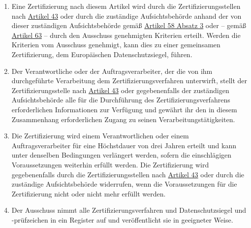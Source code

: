 \begin{enumerate}
  \item Eine Zertifizierung nach diesem Artikel wird durch die Zertifizierungsstellen nach \hyperref[ch:43]{Artikel 43}
   oder durch die zuständige Aufsichtsbehörde anhand der von dieser zuständigen Aufsichtsbehörde gemäß \hyperref
   [itm:58-3]{Artikel 58 Absatz 3} oder -- gemäß \hyperref[ch:63]{Artikel 63} -- durch den Ausschuss genehmigten
   Kriterien erteilt. Werden die Kriterien vom Ausschuss genehmigt, kann dies zu einer gemeinsamen Zertifizierung, dem
   Europäischen Datenschutzsiegel, führen.
  \label{itm:42-5}

  \item Der Verantwortliche oder der Auftragsverarbeiter, der die von ihm durchgeführte Verarbeitung dem
   Zertifizierungsverfahren unterwirft, stellt der Zertifizierungsstelle nach \hyperref[ch:43]{Artikel 43} oder
   gegebenenfalls der zuständigen Aufsichtsbehörde alle für die Durchführung des Zertifizierungsverfahrens
   erforderlichen Informationen zur Verfügung und gewährt ihr den in diesem Zusammenhang erforderlichen Zugang zu
   seinen Verarbeitungstätigkeiten.
  \label{itm:42-6}

  \item Die Zertifizierung wird einem Verantwortlichen oder einem Auftragsverarbeiter für eine Höchstdauer von drei
   Jahren erteilt und kann unter denselben Bedingungen verlängert werden, sofern die einschlägigen Voraussetzungen
   weiterhin erfüllt werden. Die Zertifizierung wird gegebenenfalls durch die Zertifizierungsstellen nach \hyperref
   [ch:43]{Artikel 43} oder durch die zuständige Aufsichtsbehörde widerrufen, wenn die Voraussetzungen für die
   Zertifizierung nicht oder nicht mehr erfüllt werden.
  \label{itm:42-7}

  \item Der Ausschuss nimmt alle Zertifizierungsverfahren und Datenschutzsiegel und -prüfzeichen in ein Register auf und
   veröffentlicht sie in geeigneter Weise.
  \label{itm:42-8}

\end{enumerate}


